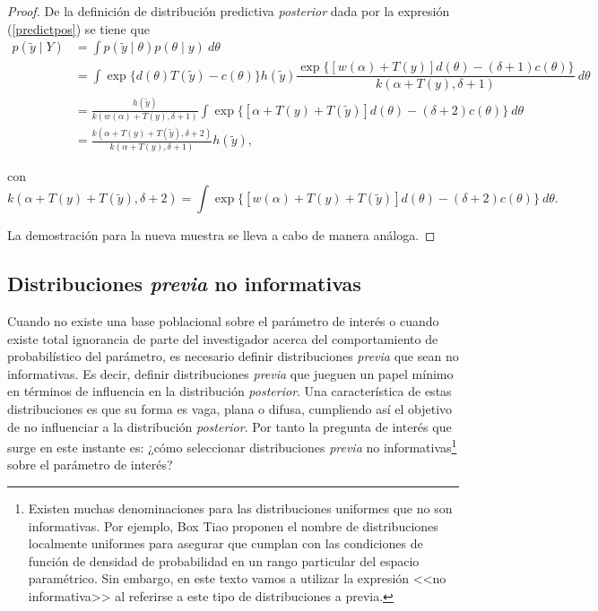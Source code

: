 \begin{proof}
De la definición de distribución predictiva \emph{posterior} dada por la expresión (\ref{predictpos}) se tiene que
\begin{align*}
p(\tilde{y} \mid Y)&=\int p(\tilde{y} \mid \theta)p(\theta \mid y)\ d\theta\\
&=\int \exp\{d(\theta)T(\tilde{y})-c(\theta)\}h(\tilde{y})\dfrac{\exp\{[w(\alpha)+T(y)]d(\theta)-(\delta+1)c(\theta)\}}{k(\alpha+T(y),\delta+1)}\ d\theta\\
&=\frac{h(\tilde{y})}{k(w(\alpha)+T(y),\delta+1)}\int \exp\{[\alpha+T(y)+T(\tilde{y})]d(\theta)-(\delta+2)c(\theta)\}\ d\theta\\
&=\frac{k(\alpha+T(y)+T(\tilde{y}),\delta+2)}{k(\alpha+T(y),\delta+1)}h(\tilde{y}),
\end{align*}

con
\begin{equation*}
k(\alpha+T(y)+T(\tilde{y}),\delta+2)=\int \exp\{[w(\alpha)+T(y)+T(\tilde{y})]d(\theta)-(\delta+2)c(\theta)\}\ d\theta.
\end{equation*}

La demostración para la nueva muestra se lleva a cabo de manera análoga.
\end{proof}

\subsection{Distribuciones \emph{previa} no informativas}

Cuando no existe una base poblacional sobre el parámetro de interés o cuando existe total ignorancia de parte del investigador acerca del comportamiento de probabilístico del parámetro, es necesario definir distribuciones \emph{previa} que sean no informativas. Es decir, definir distribuciones \emph{previa} que jueguen un papel mínimo en términos de influencia en la distribución \emph{posterior}. Una característica de estas distribuciones es que su forma es vaga, plana o difusa, cumpliendo así el objetivo de no influenciar a la distribución \emph{posterior}. Por tanto la pregunta de interés que surge en este instante es: ¿cómo seleccionar distribuciones \emph{previa} no informativas\footnote{Existen muchas denominaciones para las distribuciones uniformes que no son informativas. Por ejemplo, Box Tiao proponen el nombre de distribuciones localmente uniformes para asegurar que cumplan con las condiciones de función de densidad de probabilidad en un rango particular del espacio paramétrico. Sin embargo, en este texto vamos a utilizar la expresión <<no informativa>> al referirse a este tipo de distribuciones a previa.} sobre el parámetro de interés?

